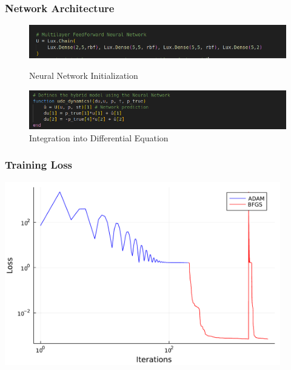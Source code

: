\documentclass[aspectratio=169]{beamer}
\begin{document}
\begin{frame}
  \frametitle{Network Architecture}

  \begin{figure}
    \centering
    \includegraphics[width=1.0\textwidth]{plots/Screenshot from 2024-08-01 00-20-22.png}
    \caption{Neural Network Initialization}
    \vspace{1em} %
    \includegraphics[width=1.0\textwidth]{plots/Screenshot from 2024-08-01 00-20-42.png}
    \caption{Integration into Differential Equation}
  \end{figure}

\end{frame}

\begin{frame}
  \frametitle{Training Loss}
  \includegraphics[width=12cm]{plots/Ideal_Data__losses.pdf}
\end{frame}
\end{document}
